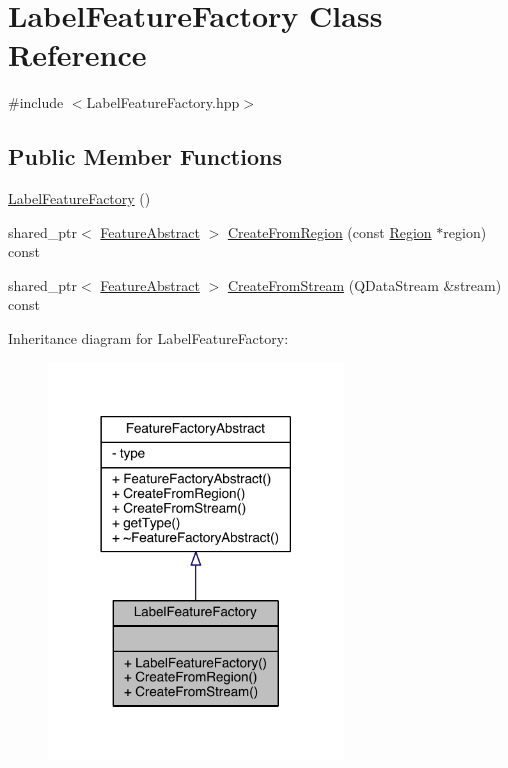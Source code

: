 \hypertarget{class_label_feature_factory}{\section{Label\+Feature\+Factory Class Reference}
\label{class_label_feature_factory}
}


{\ttfamily \#include $<$Label\+Feature\+Factory.\+hpp$>$}

\subsection*{Public Member Functions}
\begin{DoxyCompactItemize}
\item 
\hyperlink{class_label_feature_factory_ab7fc88ba9a535add8497ca772786ee7b}{Label\+Feature\+Factory} ()
\item 
shared\+\_\+ptr$<$ \hyperlink{class_feature_abstract}{Feature\+Abstract} $>$ \hyperlink{class_label_feature_factory_a3d893ad35ccb2b7eb64dad199cbf9bc1}{Create\+From\+Region} (const \hyperlink{class_region}{Region} $\ast$region) const 
\item 
shared\+\_\+ptr$<$ \hyperlink{class_feature_abstract}{Feature\+Abstract} $>$ \hyperlink{class_label_feature_factory_a9dfd71aec20d35ab08ba42d547530b81}{Create\+From\+Stream} (Q\+Data\+Stream \&stream) const 
\end{DoxyCompactItemize}


Inheritance diagram for Label\+Feature\+Factory\+:\nopagebreak
\begin{figure}[H]
\begin{center}
\leavevmode
\includegraphics[width=222pt]{class_label_feature_factory__inherit__graph}
\end{center}
\end{figure}


